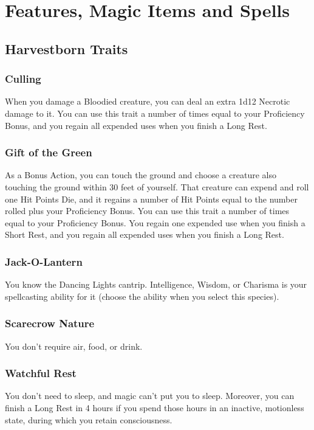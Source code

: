 \documentclass[letterpaper,openany,oneside,twocolumn]{book}
\begin{document}
\onecolumn


\rendercharactersheet

\renderbackgroundsheet

\renderspellsheet


\restoregeometry
\twocolumn

\chapter*{Features, Magic Items and Spells}

\section*{Harvestborn Traits}
\subsection*{Culling}
When you damage a Bloodied creature, you can deal an extra 1d12 Necrotic damage to it. You can use this trait a number of times equal to your Proficiency Bonus, and you regain all expended uses when you finish a Long Rest.
\subsection*{Gift of the Green}
As a Bonus Action, you can touch the ground and choose a creature also touching the ground within 30 feet of yourself. That creature can expend and roll one Hit Points Die, and it regains a number of Hit Points equal to the number rolled plus your Proficiency Bonus. You can use this trait a number of times equal to your Proficiency Bonus. You regain one expended use when you finish a Short Rest, and you regain all expended uses when you finish a Long Rest.
\subsection*{Jack-O-Lantern}
You know the Dancing Lights cantrip. Intelligence, Wisdom, or Charisma is your spellcasting ability for it (choose the ability when you select this species).
\subsection*{Scarecrow Nature}
You don't require air, food, or drink.
\subsection*{Watchful Rest}
You don't need to sleep, and magic can't put you to sleep. Moreover, you can finish a Long Rest in 4 hours if you spend those hours in an inactive, motionless state, during which you retain consciousness.\\
\end{document}
